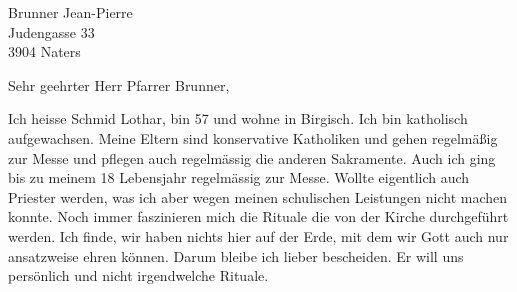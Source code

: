 \documentclass[
    12pt,
    a4paper,
    letter,
    parskip=yes,
    ]{scrlttr2}
\date{\today}
\begin{document}
\setlength{\baselineskip}{1.2\baselineskip}  %
\begin{letter}{
Brunner Jean-Pierre\\
Judengasse 33\\
3904 Naters}

\opening{Sehr geehrter Herr Pfarrer Brunner,}


Ich heisse Schmid Lothar, bin 57 und wohne in Birgisch. Ich bin katholisch aufgewachsen. Meine Eltern sind konservative Katholiken und gehen regelmäßig zur Messe und pflegen auch regelmässig die anderen Sakramente. Auch ich ging bis zu meinem 18 Lebensjahr regelmässig zur Messe. Wollte eigentlich auch Priester werden, was ich aber wegen meinen schulischen Leistungen nicht machen konnte. Noch immer faszinieren mich die Rituale die von der Kirche durchgeführt werden. Ich finde, wir haben nichts hier auf der Erde, mit dem wir Gott auch nur ansatzweise ehren können. Darum bleibe ich lieber bescheiden. Er will uns persönlich und nicht irgendwelche Rituale.



\end{letter}
\end{document}

